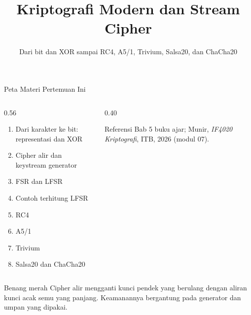 \documentclass[aspectratio=169,11pt]{beamer}
\title{Kriptografi Modern dan Stream Cipher}
\subtitle{Dari bit dan XOR sampai RC4, A5/1, Trivium, Salsa20, dan ChaCha20}
\begin{document}
\begin{frame}[plain]
    \titlepage
\end{frame}

\begin{frame}{Peta Materi Pertemuan Ini}
    \footnotesize
    \begin{columns}[T,onlytextwidth]
        \begin{column}{0.56\textwidth}
            \begin{enumerate}
                \item Dari karakter ke bit: representasi dan XOR
                \item Cipher alir dan keystream generator
                \item FSR dan LFSR
                \item Contoh terhitung LFSR
                \item RC4
                \item A5/1
                \item Trivium
                \item Salsa20 dan ChaCha20
            \end{enumerate}
        \end{column}
        \begin{column}{0.40\textwidth}
            \begin{block}{Referensi}
                \footnotesize
                Bab 5 buku ajar; Munir, \textit{IF4020 Kriptografi}, ITB,
                2026 (modul 07).
            \end{block}
        \end{column}
    \end{columns}
    \vspace{0.15cm}
    \begin{exampleblock}{Benang merah}
        \footnotesize
        Cipher alir mengganti kunci pendek yang berulang dengan aliran
        kunci acak semu yang panjang. Keamanannya bergantung pada
        generator dan umpan yang dipakai.
    \end{exampleblock}
\end{frame}
\end{document}
